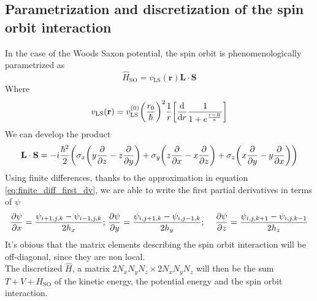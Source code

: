 \subsection{Parametrization and discretization of the spin orbit interaction}
In the case of the Woods Saxon potential, the spin orbit is phenomenologically parametrized as
\begin{equation}
    \hat {H}_\text{SO} = v_{\text{LS}}(\mathbf{r})\mathbf{L}\cdot \mathbf{S}
\end{equation}
Where 
\begin{equation}
    v_{\text{LS}}(\mathbf{r}) = v_{\text{LS}}^{(0)}\bigg(\frac{r_0}{\hbar}\bigg)^2\frac 1 r \bigg[\dv{r}\frac 1 {1+ e^{\frac{r-R}{a}}}\bigg]
\end{equation}
We can develop the product 
\begin{equation}
    \mathbf{L}\cdot \mathbf{S} = -i\frac {\hbar^2} 2 \bigg(\sigma_x \bigg(y\pdv{z} - z\pdv{y}\bigg) + \sigma_y \bigg(z\pdv{x} - x\pdv{z}\bigg) + \sigma_z \bigg(x\pdv{y} - y\pdv{x}\bigg)\bigg)
\end{equation}
Using finite differences, thanks to the approximation in equation \ref{eq:finite_diff_first_dv}, we are able to write the first partial derivatives in terms of $\psi$
\begin{align*}
    \pdv{\psi}{x} = \frac {\psi_{i+1, j, k} - \psi_{i-1, j, k}}{2h_x}
    ;&\ \pdv{\psi}{y} = \frac {\psi_{i, j+1, k} - \psi_{i, j-1, k}}{2h_y}
    ;&\ \pdv{\psi}{z} = \frac {\psi_{i, j, k+1} - \psi_{i, j, k-1}}{2h_z}
\end{align*}
It's obious that the matrix elements describing the spin orbit interaction will be off-diagonal, since they are non local.
\\The discretized $\hat H$, a matrix $2N_x N_y N_z\times 2N_x N_y N_z$ will then be the sum $T + V + H_{\text{SO}}$ of the kinetic energy, the potential energy and the spin orbit interaction. 

